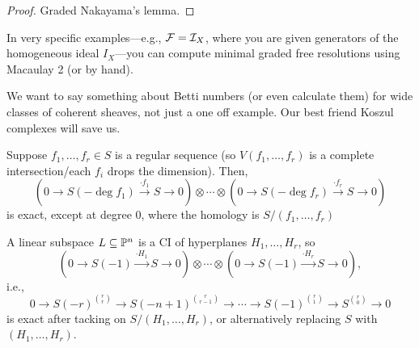 \documentclass[12pt]{article}
\begin{document}
\begin{proof}
    Graded Nakayama's lemma.
\end{proof}

\begin{rmk}
    In very specific examples---e.g., $\cF=\cI_X$, where you are given generators of the homogeneous ideal $I_X$---you can compute minimal graded free resolutions using Macaulay 2 (or by hand).

    We want to say something about Betti numbers (or even calculate them) for wide classes of coherent sheaves, not just a one off example. Our best friend Koszul complexes will save us.
\end{rmk}

\begin{thmdef}
    Suppose $f_1,\dots,f_r \in S$ is a regular sequence (so $V(f_1,\dots,f_r)$ is a complete intersection/each $f_i$ drops the dimension). Then,
    \[(0 \to S(-\deg f_1) \xrightarrow{\cdot f_1} S \to 0) \otimes \cdots \otimes (0\to S(-\deg f_r) \xrightarrow{\cdot f_r} S \to 0)\]
    is exact, except at degree 0, where the homology is $S/(f_1,\dots,f_r)$
\end{thmdef}

\begin{eg}
    A linear subspace $L\subseteq \P^n$ is a CI of hyperplanes $H_1,\dots,H_r$, so
    \[
        (0 \to S(-1) \xrightarrow{\cdot H_1} S \to 0) \otimes \cdots \otimes (0\to S(-1) \xrightarrow{\cdot H_r} S \to 0),
    \]
    i.e.,
    \[0\to S(-r)^{\binom{r}{r}} \to S(-n+1)^{\binom{r}{r-1}} \to \cdots \to S(-1)^{\binom{r}{1}} \to S^{\binom{r}{0}} \to 0\]
    is exact after tacking on $S/(H_1,\dots,H_r)$, or alternatively replacing $S$ with $(H_1,\dots,H_r)$.
\end{eg}
\end{document}
